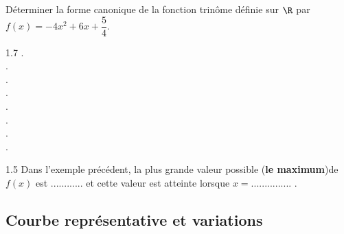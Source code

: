 \documentclass[11 pt, a4paper]{article}
\begin{document}
\begin{Ex}
Déterminer la forme canonique de la fonction trinôme définie sur $\R$ par $f(x)=-4x^2+6x+\dfrac{5}{4}$.
\begin{spacing}{1.7}
 .\dotfill \\ .\dotfill \\ .\dotfill \\ .\dotfill \\ .\dotfill \\ .\dotfill \\ .\dotfill \\ .\dotfill
\end{spacing}
\end{Ex}

\newpage
\begin{Rq}
	\begin{spacing}{1.5}
	Dans l'exemple précédent, la plus grande valeur possible (\textbf{le maximum})de $f(x)$ est ............ et cette valeur est atteinte lorsque $x = ...............$ .
	\end{spacing}
\end{Rq}

	\subsection{Courbe représentative et variations}

\vspace{-0.8cm}
\end{document}
